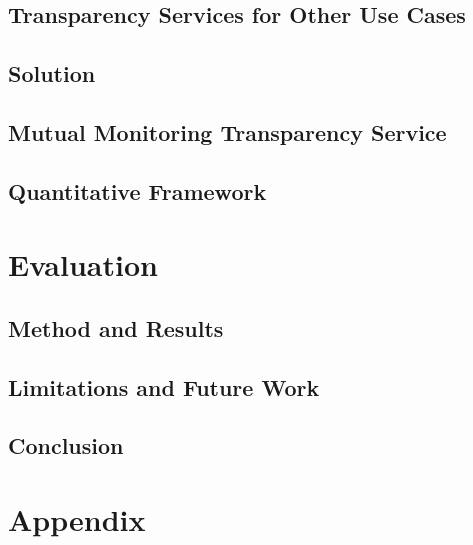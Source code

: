 \documentclass{jdf}
\begin{document}
\subsection{Transparency Services for Other Use Cases}

\subsection{Solution}

\subsection{Mutual Monitoring Transparency Service}

\subsection{Quantitative Framework}

\section{Evaluation}

\subsection{Method and Results}

\subsection{Limitations and Future Work}

\subsection{Conclusion}

\section{Appendix}



\end{document}
